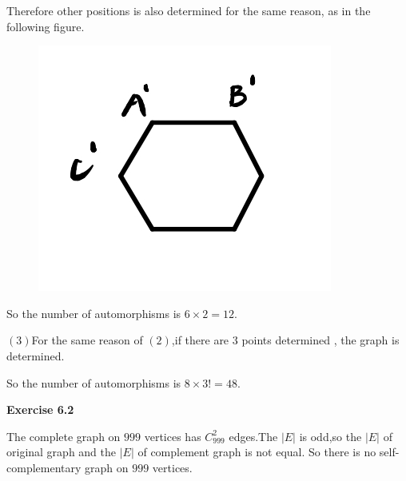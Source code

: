 \documentclass{article} %
\begin{document}
    Therefore other positions is also determined for the same reason, as in the following figure.\par
    \begin{figure}[H]
		\centering
		\includegraphics[scale=0.4]{p33.jpg}
		\caption{}
		\label{fig:3}
	\end{figure}
    So the number of automorphisms is $6 \times 2 = 12.$\par
    $(3)$For the same reason of $(2)$,if there are 3 points  determined , the graph is determined.\par
    So the number of automorphisms is $8 \times 3! = 48$.

	
	

	\textbf{Exercise 6.2}\par
    The complete graph on $999$ vertices has $C_{999}^{2}$ edges.The $|E|$ is odd,so the $|E|$ of original graph and the $|E|$ of complement graph is not equal.
    So there is no self-complementary graph on $999$ vertices.
\end{document}
